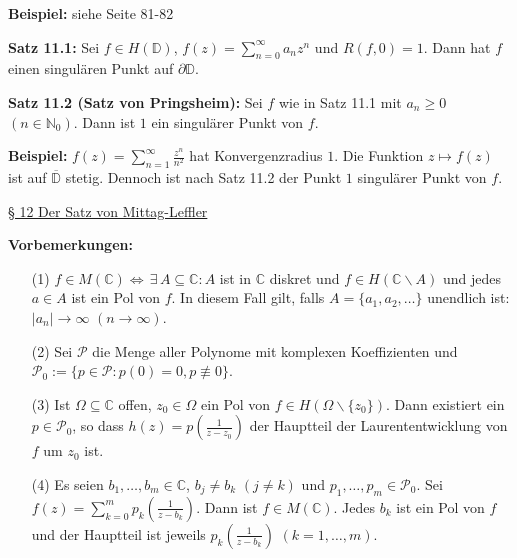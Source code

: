 \documentclass[11pt]{article}
\newcommand{\C}{\mathbb{C}}
\newcommand{\N}{\mathbb{N}}
\newcommand{\D}{\mathbb{D}}
\begin{document}
\textbf{Beispiel:} siehe Seite 81-82

\textbf{Satz 11.1:} Sei $f \in H(\D)$, $f(z) = \sum_{n=0}^\infty a_n z^n$ und $R(f,0) = 1$. Dann hat $f$ einen singulären Punkt auf $\partial \D$.

\textbf{Satz 11.2 (Satz von Pringsheim):} Sei $f$ wie in Satz 11.1 mit $a_n \geq 0$ $(n \in \N_0)$. Dann ist $1$ ein singulärer Punkt von $f$.

\textbf{Beispiel:} $f(z) = \sum_{n=1}^\infty \frac{z^n}{n^2}$ hat Konvergenzradius $1$. Die Funktion $z \mapsto f(z)$ ist auf $\overline{\D}$ stetig. Dennoch ist nach Satz 11.2 der Punkt $1$ singulärer Punkt von $f$.

\newpage
\underline{§ 12 Der Satz von Mittag-Leffler}

\textbf{Vorbemerkungen:}
\vspace{-0.6cm}
\begin{itemize}
\item[(1)] $f \in M(\C) \Leftrightarrow \, \exists \, A \subseteq \C \colon A$ ist in $\C$ diskret und $f \in H(\C \backslash A)$ und jedes $a \in A$ ist ein Pol von $f$. In diesem Fall gilt, falls $A = \{ a_1, a_2, \dots \}$ unendlich ist: $|a_n| \to \infty$ $(n \to \infty)$.  \vspace{-0.2cm}
\item[(2)] Sei $\mathcal{P}$ die Menge aller Polynome mit komplexen Koeffizienten und $\mathcal{P}_0 := \{ p \in \mathcal{P} \colon p(0) = 0, p \not\equiv 0 \}$.   \vspace{-0.2cm}
\item[(3)] Ist $\Omega \subseteq \C$ offen, $z_0 \in \Omega$ ein Pol von $f \in H(\Omega \backslash \{ z_0 \})$. Dann existiert ein $p \in \mathcal{P}_0$, so dass $h(z) = p(\frac{1}{z-z_0})$ der Hauptteil der Laurententwicklung von $f$ um $z_0$ ist. \vspace{-0.2cm}
\item[(4)] Es seien $b_1, \dots , b_m \in \C$, $b_j \neq b_k$ $(j \neq k)$ und $p_1, \dots , p_m \in \mathcal{P}_0$. Sei $f(z) = \sum_{k=0}^m p_k (\frac{1}{z - b_k})$. Dann ist $f \in M(\C)$. Jedes $b_k$ ist ein Pol von $f$ und der Hauptteil ist jeweils $p_k (\frac{1}{z-b_k})$ $(k = 1, \dots , m)$.
\end{itemize}
\vspace{-0.3cm}
\end{document}

